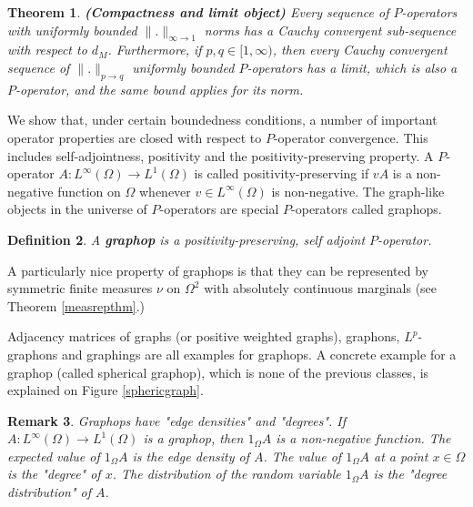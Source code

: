 \documentclass[a4wider]{amsart}
\newtheorem{theorem}{Theorem}[section]
\newtheorem{definition}[theorem]{Definition}
\newtheorem{remarka}[theorem]{Remark}
\theoremstyle{definitionbreak}\newtheorem{D}[theorem]{Definition}
\theoremstyle{definitionbreak}\newtheorem*{D*}{Definition}
\begin{document}
\begin{theorem}{\bf (Compactness and limit object)} Every sequence of $P$-operators with uniformly bounded $\|.\|_{\infty\to 1}$ norms has a Cauchy convergent sub-sequence with respect to $d_M$. Furthermore, if $p,q\in [1,\infty)$, then every Cauchy convergent sequence of $\|.\|_{p\to q}$ uniformly bounded $P$-operators has a limit, which is also a $P$-operator, and the same bound applies for its norm.
\end{theorem}

We show that, under certain boundedness conditions, a number of important operator properties are closed with respect to $P$-operator convergence. This includes self-adjointness, positivity and the positivity-preserving property. A $P$-operator $A:L^\infty(\Omega)\to L^1(\Omega)$ is called positivity-preserving if $vA$ is a non-negative function on $\Omega$ whenever $v\in L^\infty(\Omega)$ is non-negative. The graph-like objects in the universe of $P$-operators are special $P$-operators called graphops.

\begin{definition} A {\bf graphop} is a positivity-preserving, self adjoint $P$-operator. 
\end{definition} 

A particularly nice property of graphops is that they can be represented by symmetric finite measures $\nu$ on $\Omega^2$ with absolutely continuous marginals (see Theorem \ref{measrepthm}.)


Adjacency matrices of graphs (or positive weighted graphs), graphons, $L^p$-graphons and graphings are all examples for graphops. A concrete example for a graphop (called spherical graphop), which is none of the previous classes, is explained on Figure \ref{sphericgraph}. 


\begin{remarka} Graphops have {\it "edge densities"} and {\it "degrees"}. If $A:L^\infty(\Omega)\to L^1(\Omega)$ is a graphop, then $1_\Omega A$ is a non-negative function. The expected value of $1_\Omega A$ is the edge density of $A$. The value of $1_\Omega A$ at a point $x\in\Omega$ is the "degree" of $x$. The distribution of the random variable $1_\Omega A$ is the "degree distribution" of $A$.
\end{remarka}
\end{document}
